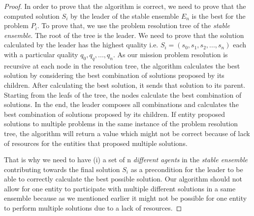 \documentclass[journal]{IEEEtran}
\theoremstyle{definition}
\begin{document}
\begin{proof}
In order to prove that the algorithm is correct, 
we need to prove that the computed solution $S_i$ by the leader of the stable ensemble $E_n$ is the best for the problem $P_i$.
To prove that, we use the problem resolution tree of the \textit{stable ensemble}. The root of the tree is the leader. We need to prove that the solution calculated by the leader has the highest quality i.e. $S_i=(s_0, s_1, s_2, ..., s_n)$ each with a particular quality  $q_0, q_q, ..., q_n$.  
As our mission problem resolution is recursive at 
each node in the resolution tree, the algorithm calculates the best solution by considering the best combination of solutions proposed by its children. After calculating the best solution, it sends that solution to its parent. Starting from the leafs of the tree, the nodes calculate the best combination of solutions. In the end, the leader composes all combinations and calculates the best combination of solutions proposed by its children. If entity proposed solutions to multiple problems in the same instance of the problem resolution tree, the algorithm will return a value which might not be correct because of lack of resources for the entities that proposed multiple solutions.

That is why we need to have (i) a set of n \textit{different agents} in the \textit{stable ensemble} contributing towards the final solution $S_i$  as a precondition for the leader to be able to correctly calculate the best possible solution. Our algorithm should not 
allow for one entity to participate with multiple different solutions in a same ensemble because as we mentioned earlier it might not be possible for one entity to perform multiple solutions due to a lack of resources.



\end{proof}
\end{document}
